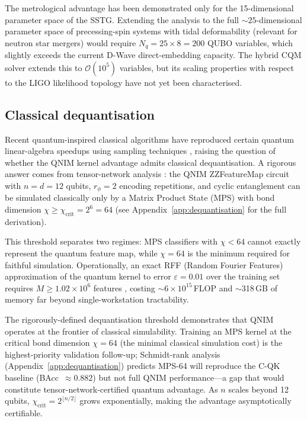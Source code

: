 \documentclass[11pt,a4paper, english]{book}
\theoremstyle{plain}
\theoremstyle{definition}
\numberwithin{equation}{chapter}
\numberwithin{figure}{chapter}
\numberwithin{table}{chapter}
\begin{document}
The metrological advantage has been demonstrated only for the 15-dimensional
parameter space of the SSTG.  Extending the analysis to the full
$\sim\!25$-dimensional parameter space of precessing-spin systems with
tidal deformability (relevant for neutron star mergers) would require
$N_q = 25 \times 8 = 200$ QUBO variables, which slightly exceeds the
current D-Wave direct-embedding capacity.  The hybrid CQM solver extends
this to $\mathcal{O}(10^5)$ variables, but its scaling properties with
respect to the LIGO likelihood topology have not yet been characterised.

\subsection{Classical dequantisation}
\label{subsec:dequantisation}

Recent quantum-inspired classical algorithms have reproduced certain quantum
linear-algebra speedups using sampling techniques \cite{Tang_2019}, raising
the question of whether the QNIM kernel advantage admits classical
dequantisation.  A rigorous answer comes from tensor-network analysis
\cite{Schreiber_2024_PRR}: the QNIM ZZFeatureMap circuit with $n = d = 12$
qubits, $r_\phi = 2$ encoding repetitions, and cyclic entanglement can be
simulated classically only by a Matrix Product State (MPS) with bond
dimension $\chi \geq \chi_\mathrm{crit} = 2^6 = 64$
(see Appendix~\ref{app:dequantisation} for the full derivation).  

This threshold separates two regimes: MPS classifiers with $\chi < 64$ cannot
exactly represent the quantum feature map, while $\chi = 64$ is the minimum
required for faithful simulation. Operationally, an exact RFF (Random Fourier
Features) approximation of the quantum kernel to error $\varepsilon = 0.01$
over the training set requires $M \geq 1.02 \times 10^6$ features
\cite{Rahimi_2007}, costing $\sim 6 \times 10^{15}$\,FLOP and $\sim$318\,GB of memory
 far beyond single-workstation tractability.

The rigorously-defined dequantisation threshold demonstrates that QNIM operates at the frontier of classical simulability.  Training an MPS kernel at the critical bond dimension $\chi = 64$ (the minimal classical simulation cost) is the highest-priority validation follow-up; Schmidt-rank analysis (Appendix~\ref{app:dequantisation}) predicts MPS-64 will reproduce the C-QK baseline (BAcc~$\approx 0.882$) but not full QNIM performance---a gap that would constitute tensor-network-certified quantum advantage.  As $n$ scales beyond 12 qubits, $\chi_\mathrm{crit} = 2^{\lfloor n/2 \rfloor}$ grows exponentially, making the advantage asymptotically certifiable.
\end{document}
